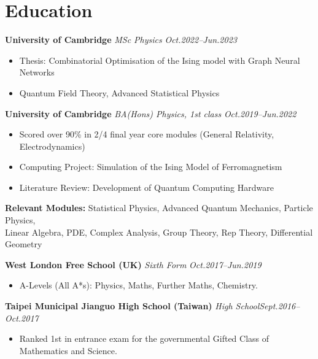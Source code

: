 \documentclass[11pt,a4paper,roman]{moderncv}        %
\begin{document}
\makecvtitle

\section{Education}

\textbf{University of Cambridge} \textit{MSc Physics} \hfill \textit{Oct.2022--Jun.2023}
\begin{itemize}
	\item Thesis: Combinatorial Optimisation of the Ising model with Graph Neural Networks
	\item Quantum Field Theory, Advanced Statistical Physics
\end{itemize}

\vspace*{3mm}


\textbf{University of Cambridge} \textit{BA(Hons) Physics, 1st class} \hfill \textit{Oct.2019--Jun.2022}
\begin{itemize}
	\item Scored over 90\% in 2/4 final year core modules (General Relativity, Electrodynamics)
	\item Computing Project: Simulation of the Ising Model of Ferromagnetism
	\item Literature Review: Development of Quantum Computing Hardware
\end{itemize}
\vspace*{1mm}
\textbf{Relevant Modules:} Statistical Physics, Advanced Quantum Mechanics, Particle Physics,\\
Linear Algebra, PDE, Complex Analysis, Group Theory, Rep Theory, Differential Geometry
\vspace*{3mm}

\textbf{West London Free School (UK)} \textit{Sixth Form} \hfill \textit{Oct.2017--Jun.2019}
\begin{itemize}
	\item{A-Levels (All A*s): Physics, Maths, Further Maths, Chemistry.}
\end{itemize}
\vspace*{3mm}

\textbf{Taipei Municipal Jianguo High School (Taiwan)} \textit{High School}\hfill \textit{Sept.2016--Oct.2017}
\begin{itemize}
	\item{Ranked 1st in entrance exam for the governmental Gifted Class of Mathematics and Science.}
\end{itemize}
\end{document}
